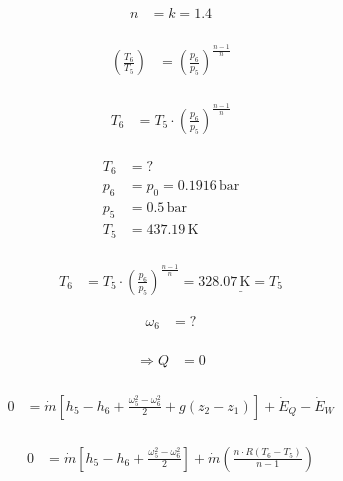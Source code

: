 \begin{align*}
n &= k = 1.4 \\
\end{align*}


\begin{align*}
\left( \frac{T_6}{T_5} \right) &= \left( \frac{p_6}{p_5} \right)^{\frac{n-1}{n}} \\
\end{align*}

\begin{align*}
T_6 &= T_5 \cdot \left( \frac{p_6}{p_5} \right)^{\frac{n-1}{n}} \\
\end{align*}

\begin{align*}
T_6 &= ? \\
p_6 &= p_0 = 0.1916 \, \text{bar} \\
p_5 &= 0.5 \, \text{bar} \\
T_5 &= 437.19 \, \text{K} \\
\end{align*}

\begin{align*}
T_6 &= T_5 \cdot \left( \frac{p_6}{p_5} \right)^{\frac{n-1}{n}} = \underline{328.07 \, \text{K} = T_5}
\end{align*}

\begin{align*}
\omega_6 &= ? \\
\end{align*}


\begin{align*}
\Rightarrow Q &= 0 \\
\end{align*}



\begin{align*}
0 &= \dot{m} \left[ h_5 - h_6 + \frac{\omega_5^2 - \omega_6^2}{2} + g(z_2 - z_1) \right] + \dot{E}_Q - \dot{E}_W \\
\end{align*}

\begin{align*}
0 &= \dot{m} \left[ h_5 - h_6 + \frac{\omega_5^2 - \omega_6^2}{2} \right] + \dot{m} \left( \frac{n \cdot R (T_6 - T_5)}{n-1} \right) \\
\end{align*}

